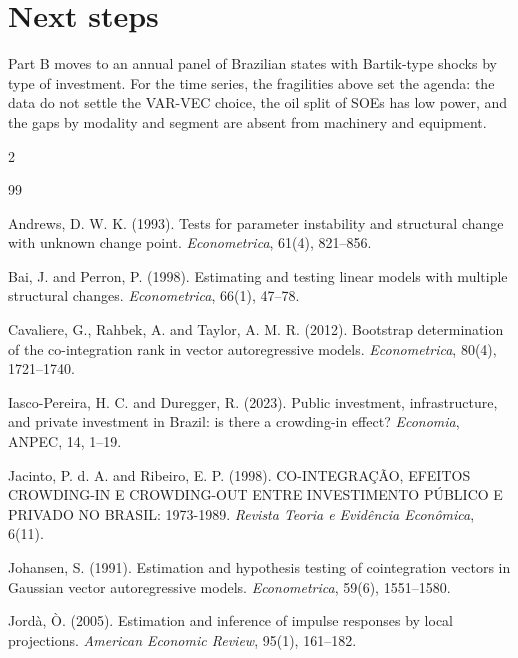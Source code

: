 \documentclass[11pt,a4paper]{article}
\begin{document}
\section{Next steps}

Part B moves to an annual panel of Brazilian states with Bartik-type shocks by type of investment. For the time series, the fragilities above set the agenda: the data do not settle the VAR-VEC choice, the oil split of SOEs has low power, and the gaps by modality and segment are absent from machinery and equipment.

\vspace{-3pt}
\begin{multicols}{2}
\raggedcolumns
\scriptsize
\renewcommand{\refname}{\normalsize References}
\begin{thebibliography}{99}

Andrews, D. W. K. (1993). Tests for parameter instability and structural change with unknown change point. \textit{Econometrica}, 61(4), 821--856.

Bai, J. and Perron, P. (1998). Estimating and testing linear models with multiple structural changes. \textit{Econometrica}, 66(1), 47--78.

Cavaliere, G., Rahbek, A. and Taylor, A. M. R. (2012). Bootstrap determination of the co-integration rank in vector autoregressive models. \textit{Econometrica}, 80(4), 1721--1740.

Iasco-Pereira, H. C. and Duregger, R. (2023). Public investment, infrastructure, and private investment in Brazil: is there a crowding-in effect? \textit{Economia}, ANPEC, 14, 1--19.

Jacinto, P. d. A. and Ribeiro, E. P. (1998). CO-INTEGRAÇÃO, EFEITOS CROWDING-IN E CROWDING-OUT ENTRE INVESTIMENTO PÚBLICO E PRIVADO NO BRASIL: 1973-1989. \textit{Revista Teoria e Evidência Econômica}, 6(11).

Johansen, S. (1991). Estimation and hypothesis testing of cointegration vectors in Gaussian vector autoregressive models. \textit{Econometrica}, 59(6), 1551--1580.

Jord\`a, \`O. (2005). Estimation and inference of impulse responses by local projections. \textit{American Economic Review}, 95(1), 161--182.


\end{thebibliography}
\end{multicols}
\end{document}
